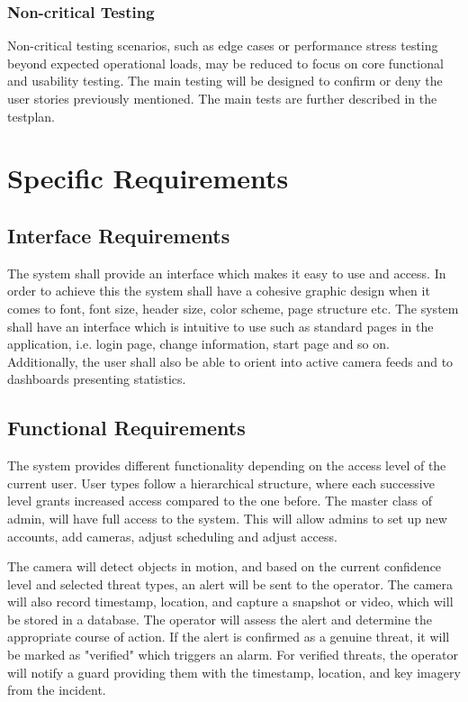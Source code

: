 \documentclass{article}
\begin{document}
\subsubsection{Non-critical Testing}
Non-critical testing scenarios, such as edge cases or performance stress testing beyond expected operational loads, may be reduced to focus on core functional and usability testing. The main testing will be designed to confirm or deny the user stories previously mentioned. The main tests are further described in the testplan.

\newpage

\section{Specific Requirements}

\subsection{Interface Requirements}
The system shall provide an interface which makes it easy to use and access. In order to achieve this the system shall have a cohesive graphic design when it comes to font, font size, header size, color scheme, page structure etc. The system shall have an interface which is intuitive to use such as standard pages in the application, i.e. login page, change information, start page and so on. Additionally, the user shall also be able to orient into active camera feeds and to dashboards presenting statistics. 


\subsection{Functional Requirements}
The system provides different functionality depending on the access level of the current user. User types follow a hierarchical structure, where each successive level grants increased access compared to the one before. The master class of admin, will have full access to the system. This will allow admins to set up new accounts, add cameras, adjust scheduling and adjust access. 

The camera will detect objects in motion, and based on the current confidence level and selected threat types, an alert will be sent to the operator. The camera will also record  timestamp, location, and capture a snapshot or video, which will be stored in a database. The operator will assess the alert and determine the appropriate course of action. If the alert is confirmed as a genuine threat, it will be marked as "verified" which triggers an alarm. For verified threats, the operator will notify a guard providing them with the timestamp, location, and key imagery from the incident. 
\end{document}
